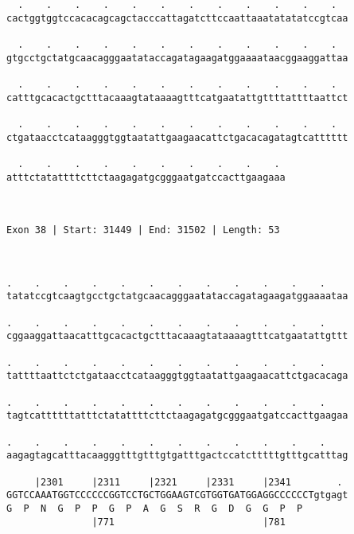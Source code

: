 \documentclass{article}
\begin{document}
\begin{Verbatim}
  .    .    .    .    .    .    .    .    .    .    .    .  
cactggtggtccacacagcagctacccattagatcttccaattaaatatatatccgtcaa
                                                            
  .    .    .    .    .    .    .    .    .    .    .    .  
gtgcctgctatgcaacagggaatataccagatagaagatggaaaataacggaaggattaa
                                                            
  .    .    .    .    .    .    .    .    .    .    .    .  
catttgcacactgctttacaaagtataaaagtttcatgaatattgttttattttaattct
                                                            
  .    .    .    .    .    .    .    .    .    .    .    .  
ctgataacctcataagggtggtaatattgaagaacattctgacacagatagtcatttttt
                                                            
  .    .    .    .    .    .    .    .    .    . 
atttctatattttcttctaagagatgcgggaatgatccacttgaagaaa
                                                 
                                                 
 
Exon 38 | Start: 31449 | End: 31502 | Length: 53



.    .    .    .    .    .    .    .    .    .    .    .    
tatatccgtcaagtgcctgctatgcaacagggaatataccagatagaagatggaaaataa
                                                            
.    .    .    .    .    .    .    .    .    .    .    .    
cggaaggattaacatttgcacactgctttacaaagtataaaagtttcatgaatattgttt
                                                            
.    .    .    .    .    .    .    .    .    .    .    .    
tattttaattctctgataacctcataagggtggtaatattgaagaacattctgacacaga
                                                            
.    .    .    .    .    .    .    .    .    .    .    .    
tagtcattttttatttctatattttcttctaagagatgcgggaatgatccacttgaagaa
                                                            
.    .    .    .    .    .    .    .    .    .    .    .    
aagagtagcatttacaagggtttgtttgtgatttgactccatctttttgtttgcatttag
                                                            
     |2301     |2311     |2321     |2331     |2341        . 
GGTCCAAATGGTCCCCCCGGTCCTGCTGGAAGTCGTGGTGATGGAGGCCCCCCTgtgagt
G  P  N  G  P  P  G  P  A  G  S  R  G  D  G  G  P  P        
               |771                          |781           
  

\end{Verbatim}
\end{document}
